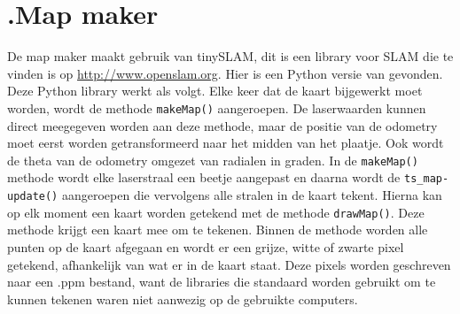 \documentclass[a4paper,10pt]{article}
\begin{document}
\section*{\label{mapmaker}\thesection.\quad Map maker}
De map maker maakt gebruik van tinySLAM, dit is een library voor SLAM die te vinden is op \url{http://www.openslam.org}.
Hier is een Python versie %
van gevonden. Deze Python library werkt als volgt. Elke keer dat de kaart bijgewerkt moet worden, wordt de methode \verb!makeMap()! aangeroepen. De laserwaarden kunnen direct meegegeven worden aan deze methode, maar de positie van de
odometry moet eerst worden getransformeerd naar het midden van het plaatje. Ook wordt de theta van de odometry omgezet van radialen in graden. In de \verb!makeMap()! methode wordt elke laserstraal een beetje aangepast en daarna wordt de \verb!ts_map-update()! aangeroepen die vervolgens alle stralen in de kaart tekent. Hierna kan op elk moment een kaart worden getekend met de methode \verb!drawMap()!. Deze methode krijgt een kaart mee om te tekenen. Binnen de methode worden alle punten op de kaart afgegaan en wordt er een grijze, witte of zwarte pixel getekend, afhankelijk van wat er in de kaart staat. Deze pixels worden geschreven naar een .ppm bestand, want de libraries die standaard worden gebruikt om te kunnen tekenen waren niet aanwezig op de gebruikte computers.
\end{document}
